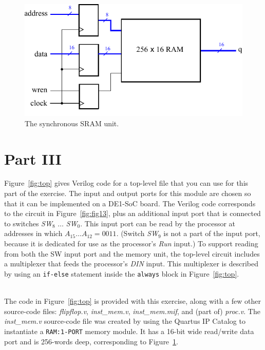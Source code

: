 \documentclass[epsfig,10pt,fullpage]{article}
\begin{document}
\begin{figure}[b]
\begin{center}
\includegraphics{figures/figure14.pdf}
\end{center}
\vspace{-0.5cm}
\caption{The synchronous SRAM unit.}
\label{fig:fig14}
\end{figure}

\section*{Part III}

Figure~\ref{fig:top} gives Verilog code for a top-level file that you can use for this
part of the exercise. The input and output ports for this module are chosen so that it can
be implemented on a DE1-SoC board. The Verilog code corresponds to the circuit 
in Figure~\ref{fig:fig13},
plus an additional input port that is connected to switches {\it SW}$_8$ $\ldots$ {\it SW}$_0$.
This input port can be read by the processor at addresses in which $A_{15} \ldots A_{12} = 0011$.
(Switch {\it SW}$_9$ is not a part of the input port, because it is dedicated for use as the
processor's {\it Run} input.) To support reading from both the SW input port and the memory
unit, the top-level circuit includes a multiplexer that feeds the processor's {\it DIN}
input. This multiplexer is described by using an \texttt{if-else} statement inside 
the \texttt{always} block in Figure~\ref{fig:top}.

~\\
\noindent
The code in Figure~\ref{fig:top} is provided with this exercise, along with a few
other source-code files: {\it flipflop.v}, {\it inst\_mem.v}, {\it inst\_mem.mif}, and 
(part of) {\it proc.v}. The {\it inst\_mem.v} source-code file was created by using the Quartus IP 
Catalog to instantiate a \texttt{RAM:1-PORT} memory module. It has a 16-bit wide read/write
data port and is 256-words deep, corresponding to Figure~\ref{fig:fig14}.
\end{document}
